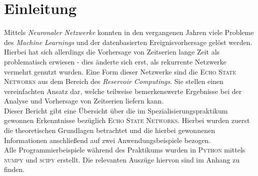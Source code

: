 \section{Einleitung}
Mittels \textit{Neuronaler Netzwerke} konnten in den vergangenen Jahren viele Probleme des \textit{Machine Learnings} und der datenbasierten Ereignisvorhersage gelöst werden. Hierbei hat sich allerdings die Vorhersage von Zeitserien lange Zeit als problematisch erwiesen - dies änderte sich erst, als rekurrente Netzwerke vermehrt genutzt wurden. Eine Form dieser Netzwerke sind die \textsc{Echo State Networks} aus dem Bereich des \textit{Reservoir Computings}. Sie stellen einen vereinfachten Ansatz dar, welche teilweise bemerkenswerte Ergebnisse bei der Analyse und Vorhersage von Zeitserien liefern kann.\\  

Dieser Bericht gibt eine Übersicht über die im Spezialisierungspraktikum gewonnen Erkenntnisse bezüglich \textsc{Echo State Networks}. Hierbei wurden zuerst die theoretischen Grundlagen betrachtet und die hierbei gewonnenen Informationen anschließend auf zwei Anwendungsbeispiele bezogen.\\

Alle Programmierbeispiele während des Praktikums wurden in \textsc{Python} mittels \textsc{numpy} und \textsc{scipy} erstellt. Die relevanten Auszüge hiervon sind im Anhang zu finden.